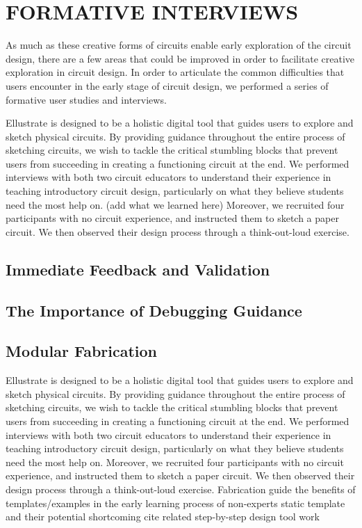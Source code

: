 \documentclass{sigchi}
\begin{document}


\section{FORMATIVE INTERVIEWS}

As much as these creative forms of circuits enable early exploration of the circuit design, there are a few areas that could be improved in order to facilitate creative exploration in circuit design. In order to articulate the common difficulties that users encounter in the early stage of circuit design, we performed a series of formative user studies and interviews. 


Ellustrate is designed to be a holistic digital tool that guides users to explore and sketch physical circuits. By providing guidance throughout the entire process of sketching circuits, we wish to tackle the critical stumbling blocks that prevent users from succeeding in creating a functioning circuit at the end. We performed interviews with both two circuit educators to understand their experience in teaching introductory circuit design, particularly on what they believe students need the most help on. (add what we learned here) Moreover, we recruited four participants with no circuit experience, and instructed them to sketch a paper circuit. We then observed their design process through a think-out-loud exercise. 
\subsection{Immediate Feedback and Validation}
\subsection{The Importance of Debugging Guidance}
\subsection{Modular Fabrication}
Ellustrate is designed to be a holistic digital tool that guides users to explore and sketch physical circuits. By providing guidance throughout the entire process of sketching circuits, we wish to tackle the critical stumbling blocks that prevent users from succeeding in creating a functioning circuit at the end. We performed interviews with both two circuit educators to understand their experience in teaching introductory circuit design, particularly on what they believe students need the most help on.  Moreover, we recruited four participants with no circuit experience, and instructed them to sketch a paper circuit. We then observed their design process through a think-out-loud exercise. 
Fabrication guide 
the benefits of templates/examples in the early learning process of non-experts
static template and their potential shortcoming 
cite related step-by-step design tool work 
\end{document}
